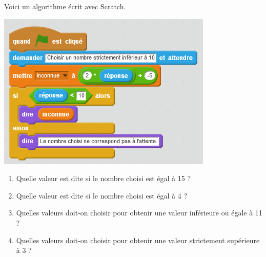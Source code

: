 \documentclass{article}
\begin{document}
\Exe

Voici un algorithme écrit avec Scratch.

\includegraphics[scale=1]{scratch.png} 

\begin{enumerate}
\item Quelle valeur est dite si le nombre choisi est égal à 15 ?
\item Quelle valeur est dite si le nombre choisi est égal à  4 ?
\item Quelles valeurs doit-on choisir pour obtenir une valeur inférieure ou égale à 11 ? 
\item Quelles valeurs doit-on choisir pour obtenir une valeur strictement supérieure à 3 ? 
\end{enumerate}
\end{document}
